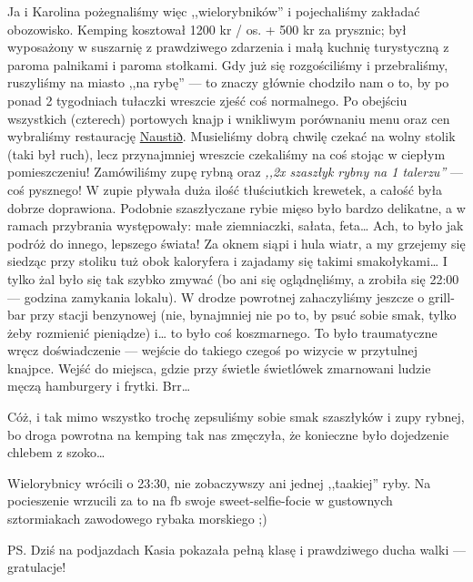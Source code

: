 
Ja i Karolina pożegnaliśmy więc ,,wielorybników'' i pojechaliśmy zakładać obozowisko. Kemping kosztował 1200 kr / os. + 500 kr za prysznic; był wyposażony w suszarnię z prawdziwego zdarzenia i małą kuchnię turystyczną z paroma palnikami i paroma stołkami. Gdy już się rozgościliśmy i przebraliśmy, ruszyliśmy na miasto ,,na rybę'' --- to znaczy głównie chodziło nam o to, by po ponad 2 tygodniach tułaczki wreszcie zjeść coś normalnego. Po obejściu wszystkich (czterech) portowych knajp i wnikliwym porównaniu menu oraz cen wybraliśmy restaurację \href{https://www.facebook.com/naustid}{Naustið}. Musieliśmy dobrą chwilę czekać na wolny stolik (taki był ruch), lecz przynajmniej wreszcie czekaliśmy na coś stojąc w ciepłym pomieszczeniu! Zamówiliśmy zupę rybną oraz \emph{,,2x szaszłyk rybny na 1 talerzu''} --- coś pysznego! W zupie pływała duża ilość tłuściutkich krewetek, a całość była dobrze doprawiona. Podobnie szaszłyczane rybie mięso było bardzo delikatne, a w ramach przybrania występowały: małe ziemniaczki, sałata, feta… Ach, to było jak podróż do innego, lepszego świata! Za oknem siąpi i hula wiatr, a my grzejemy się siedząc przy stoliku tuż obok kaloryfera i zajadamy się takimi smakołykami… I tylko żal było się tak szybko zmywać (bo ani się oglądnęliśmy, a zrobiła się 22:00 --- godzina zamykania lokalu). W drodze powrotnej zahaczyliśmy jeszcze o grill-bar przy stacji benzynowej (nie, bynajmniej nie po to, by psuć sobie smak, tylko żeby rozmienić pieniądze) i… to było coś koszmarnego. To było traumatyczne wręcz doświadczenie --- wejście do takiego czegoś po wizycie w przytulnej knajpce. Wejść do miejsca, gdzie przy świetle świetlówek zmarnowani ludzie męczą hamburgery i frytki. Brr…


Cóż, i tak mimo wszystko trochę zepsuliśmy sobie smak szaszłyków i zupy rybnej, bo droga powrotna na kemping tak nas zmęczyła, że konieczne było dojedzenie chlebem z szoko…

Wielorybnicy wrócili o 23:30, nie zobaczywszy ani jednej ,,taakiej'' ryby. Na pocieszenie wrzucili za to na fb swoje sweet-selfie-focie w gustownych sztormiakach zawodowego rybaka morskiego ;)

PS. Dziś na podjazdach Kasia pokazała pełną klasę i prawdziwego ducha walki --- gratulacje!
